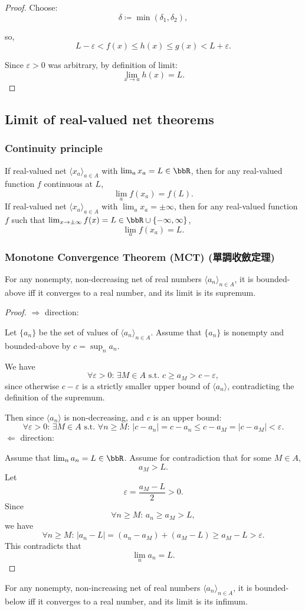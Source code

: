 \documentclass[a4paper,12pt]{report}
\begin{document}
\begin{itemize}
\begin{itemize}
\begin{proof}
Choose:
\[\delta\coloneq\min(\delta_1,\delta_2),\]

so,
\[L-\varepsilon<f(x)\leq h(x)\leq g(x)<L+\varepsilon.\]

Since $\varepsilon > 0$ was arbitrary, by definition of limit:
\[\lim_{x\to a}h(x)=L.\]
\end{proof}
\subsection{Limit of real-valued net theorems}
\subsubsection{Continuity principle}
If real-valued net $\langle x_a\rangle_{a\in A}$ with $\lim_ax_a=L\in\bbR$, then for any real-valued function $f$ continuous at $L$,
\[\lim_af(x_a)=f(L).\]
If real-valued net $\langle x_a\rangle_{a\in A}$ with $\lim_ax_a=\pm\infty$, then for any real-valued function $f$ such that $\lim_{x\to\pm\infty}f(x)=L\in\bbR\cup\{-\infty,\infty\}$,
\[\lim_af(x_a)=L.\]
\subsubsection{Monotone Convergence Theorem (MCT) (單調收斂定理)}
For any nonempty, non-decreasing net of real numbers $\langle a_n\rangle_{n\in A}$, it is bounded-above iff it converges to a real number, and its limit is its supremum.
\begin{proof}
$\Rightarrow$ direction:

Let $\{a_n\}$ be the set of values of $\langle a_n\rangle_{n\in A}$. Assume that $\{a_n\}$ is nonempty and bounded-above by $c=\sup_na_n$.

We have
\[\forall\varepsilon>0:\,\exists M\in A\text{\ s.t.\ }c\geq a_M>c-\varepsilon,\]
since otherwise $c-\varepsilon$ is a strictly smaller upper bound of $\langle a_n\rangle$, contradicting the definition of the supremum. 

Then since $\langle a_n\rangle$ is non-decreasing, and $c$ is an upper bound:
\[\forall\varepsilon>0:\,\exists M\in A\text{\ s.t.\ }\forall n\geq M:\,|c-a_n|=c-a_n\leq c-a_M=|c-a_M|<\varepsilon.\]
$\Leftarrow$ direction:

Assume that $\lim_na_n=L\in\bbR$. Assume for contradiction that for some $M\in A$,
\[a_M>L.\]
Let
\[\varepsilon=\frac{a_M-L}{2}>0.\]
Since
\[\forall n\geq M:\, a_n\geq a_M>L,\]
we have
\[\forall n\geq M:\,|a_n-L|=(a_n-a_M)+(a_M-L)\geq a_M-L>\varepsilon.\]
This contradicts that
\[\lim_na_n=L.\]
\end{proof}
For any nonempty, non-increasing net of real numbers $\langle a_n\rangle_{n\in A}$, it is bounded-below iff it converges to a real number, and its limit is its infimum.


\end{itemize}
\end{itemize}
\end{document}
